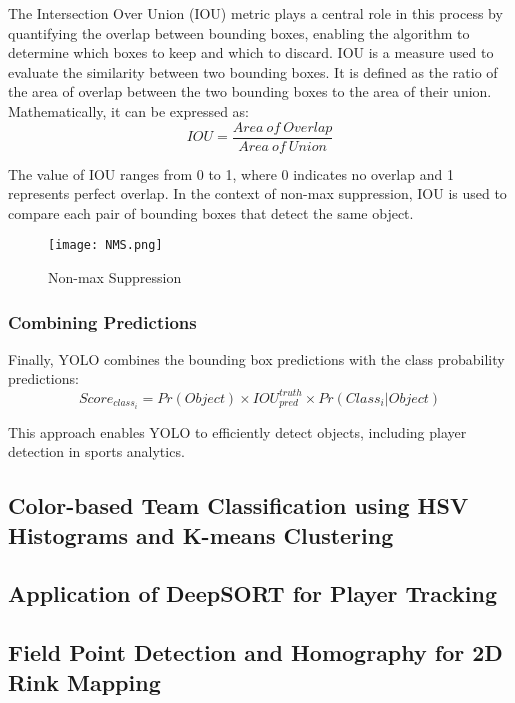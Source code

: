 \documentclass[12pt, letterpaper]{article}
\begin{document}
{\begin{spacing}{1.2}
The Intersection Over Union (IOU) metric plays a central role in this process by quantifying the overlap between bounding boxes, enabling the algorithm to determine which boxes to keep and which to discard. IOU is a measure used to evaluate the similarity between two bounding boxes. It is defined as the ratio of the area of overlap between the two bounding boxes to the area of their union. Mathematically, it can be expressed as:
\begin{equation*}
    IOU = \frac{Area\: of\: Overlap}{Area\: of\: Union}
\end{equation*}

The value of IOU ranges from 0 to 1, where 0 indicates no overlap and 1 represents perfect overlap. In the context of non-max suppression, IOU is used to compare each pair of bounding boxes that detect the same object.

\begin{figure}[htbp]
\centering
\texttt{[image: NMS.png]}
\captionsetup{font=large}
\caption{Non-max Suppression}
\label{fig:NMS}
\end{figure}


\subsubsection{Combining Predictions}
Finally, YOLO combines the bounding box predictions with the class probability predictions:
\begin{equation*}
    Score_{class_i} = Pr(Object) \times IOU_{pred}^{truth} \times Pr(Class_i | Object)
\end{equation*}

This approach enables YOLO to efficiently detect objects, including player detection in sports analytics.

\end{spacing}
}

\subsection{Color-based Team Classification using HSV Histograms and K-means Clustering}
\subsection{Application of DeepSORT for Player Tracking}
\subsection{Field Point Detection and Homography for 2D Rink Mapping}
\end{document}
